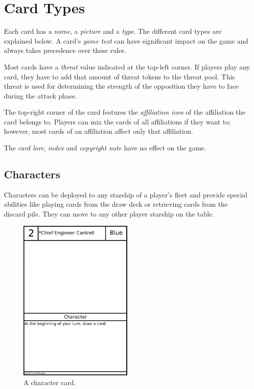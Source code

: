 \documentclass[11pt, a4paper]{article}
\begin{document}
\section{Card Types}

Each card has a \emph{name}, a \emph{picture} and a \emph{type}. The different
card types are explained below. A card's \emph{game text} can have significant
impact on the game and always takes precedence over these rules.

Most cards have a \emph{threat} value indicated at the top-left corner. If
players play any card, they have to add that amount of threat tokens to the
threat pool. This threat is used for determining the strength of the opposition
they have to face during the attack phase.

The top-right corner of the card features the \emph{affiliation icon} of the
affiliation the card belongs to. Players can mix the cards of all affiliations
if they want to; however, most cards of an affiliation affect only that
affiliation.

The \emph{card lore}, \emph{index} and \emph{copyright note} have no effect on
the game.

\subsection{Characters}

Characters can be deployed to any starship of a player's fleet and provide
special abilities like playing cards from the draw deck or retrieving cards from
the discard pile. They can move to any other player starship on the table.

\begin{figure}
  \centering
  \includegraphics[width=0.5\textwidth]{examplecharacter.png}
  \caption{A character card.}
\end{figure}
\end{document}
